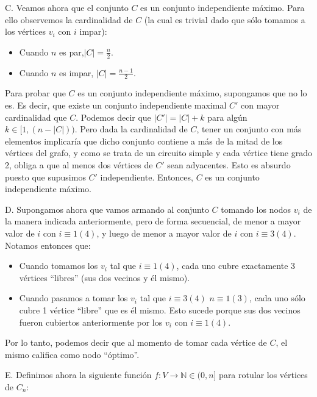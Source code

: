 C. Veamos ahora que el conjunto $C$ es un conjunto independiente máximo.  Para ello observemos la cardinalidad de $C$ (la cual es trivial dado que sólo tomamos a los vértices $v_i$ con $i$ impar):

\begin{itemize}
	\item Cuando $n$ es par,$|C| = \frac{n}{2}$.
	\item Cuando $n$ es impar, $|C| = \frac{n-1}{2}$.	
\end{itemize}

Para probar que $C$ es un conjunto independiente máximo, supongamos que no lo es.  Es decir, que existe un conjunto independiente maximal $C'$ con mayor cardinalidad que $C$.  Podemos decir que $|C'| = |C| + k$ para algún $k \in [1, (n -|C|))$. Pero dada la cardinalidad de $C$, tener un conjunto con más elementos implicaría que dicho conjunto contiene a más de la mitad de los vértices del grafo, y como se trata de un circuito simple y cada vértice tiene grado 2, obliga a que al menos dos vértices de $C'$ sean adyacentes.  Esto es absurdo puesto que supusimos $C'$ independiente.  Entonces, $C$ es un conjunto independiente máximo.

D. Supongamos ahora que vamos armando al conjunto $C$ tomando los nodos $v_i$ de la manera indicada anteriormente, pero de forma secuencial, de menor a mayor valor de $i$ con $i \equiv 1 (4)$, y luego de menor a mayor valor de $i$ con $i \equiv 3 (4)$. Notamos entonces que:

\begin{itemize}
	\item Cuando tomamos los $v_i$ tal que $i \equiv 1 (4)$, cada uno cubre exactamente 3 vértices ``libres'' (sus dos vecinos y él mismo).
	\item Cuando pasamos a tomar los $v_i$ tal que $i \equiv 3 (4)$ $n \equiv 1 (3)$, cada uno sólo cubre 1 vértice ``libre'' que es él mismo.  Esto sucede porque sus dos vecinos fueron cubiertos anteriormente por los $v_i$ con $i \equiv 1 (4)$.
\end{itemize}

Por lo tanto, podemos decir que al momento de tomar cada vértice de $C$, el mismo califica como nodo ``óptimo''.

E. Definimos ahora la siguiente función $f:V \rightarrow \mathbb{N} \in (0,n]$ para rotular los vértices de $C_n$:

